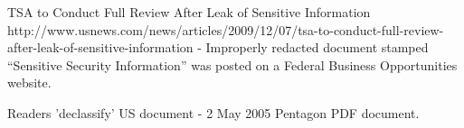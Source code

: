 TSA to Conduct Full Review After Leak of Sensitive Information
http://www.usnews.com/news/articles/2009/12/07/tsa-to-conduct-full-review-after-leak-of-sensitive-information
- Improperly redacted document stamped ``Sensitive Security
Information'' was posted on a Federal Business Opportunities website.

Readers 'declassify' US document - 2 May 2005
Pentagon PDF document.





